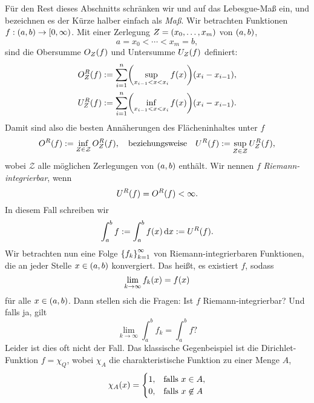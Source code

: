 Für den Rest dieses Abschnitts schränken wir und auf das Lebesgue-Maß ein, und bezeichnen es der Kürze halber einfach als \emph{Maß}.
Wir betrachten Funktionen \(f: \parentheses*{a, b} \to \left[0, \infty\right)\).
Mit einer Zerlegung \(Z = \parentheses*{x_0, \ldots, x_m}\) von \(\parentheses*{a, b}\),
\[
	a = x_0 < \cdots < x_m = b,
\]
sind die Obersumme \(O_Z\parentheses*{f}\) und Untersumme \(U_Z\parentheses*{f}\) definiert:
\begin{align}
	O_Z^R\parentheses*{f} &:= \sum_{i = 1}^n \parentheses*{\sup_{x_{i - 1} < x < x_i}f\parentheses*{x}}\parentheses*{x_i - x_{i - 1}},\label{equation:1}\\
	U_Z^R\parentheses*{f} &:= \sum_{i = 1}^n \parentheses*{\inf_{x_{i - 1} < x < x_i}f\parentheses*{x}}\parentheses*{x_i - x_{i - 1}}.\label{equation:2}
\end{align}
Damit sind also die besten Annäherungen des Flächeninhaltes unter \(f\)
\begin{equation}
	O^R\parentheses*{f} := \inf_{Z \in \mathcal{Z}}O_Z^R\parentheses*{f}, \quad \text{beziehungsweise} \quad U^R\parentheses*{f} := \sup_{Z \in \mathcal{Z}}U_Z^R\parentheses*{f},
\end{equation}
wobei \(\mathcal{Z}\) alle möglichen Zerlegungen von \(\parentheses*{a, b}\) enthält.
Wir nennen \(f\) \emph{Riemann-integrierbar}, wenn
\begin{equation}
	U^R\parentheses*{f} = O^R\parentheses*{f} < \infty.
\end{equation}
In diesem Fall schreiben wir
\[
	\int_a^b f := \int_a^b f\parentheses*{x}\d x := U^R\parentheses*{f}.
\]
Wir betrachten nun eine Folge \(\braces*{f_k}_{k = 1}^\infty\) von Riemann-integrierbaren Funktionen, die an jeder Stelle \(x \in \parentheses*{a, b}\) konvergiert.
Das heißt, es existiert \(f\), sodass
\[
	\lim_{k \to \infty}f_k\parentheses*{x} = f\parentheses*{x}
\]
für alle \(x \in \parentheses*{a, b}\).
Dann stellen sich die Fragen:
Ist \(f\) Riemann-integrierbar?
Und falls ja, gilt
\begin{equation}
	\lim_{k \to \infty}\int_a^b f_k = \int_a^b f\text{?}
\end{equation}
Leider ist dies oft nicht der Fall.
Das klassische Gegenbeispiel ist die Dirichlet-Funktion \(f = \chi_Q\), wobei \(\chi_A\) die charakteristische Funktion zu einer Menge \(A\),
\begin{equation}\label{equation:6}
	\chi_A\parentheses*{x} = \begin{cases}
		1, & \text{falls }x \in A,\\
		0, & \text{falls }x \not\in A
	\end{cases}
\end{equation}
